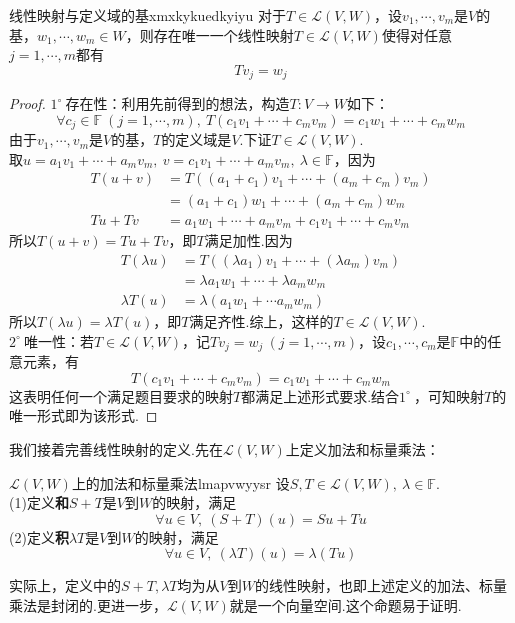 \documentclass[lang=cn, zihao=5]{elegantbook}
\newcommand{\F}{\mathbb{F}}
\newcommand{\lmap}{\mathcal{L}}
\newcommand{\buzhou}[1]{$#1^{\circ} \ $}
\begin{document}
\begin{proposition}{线性映射与定义域的基}{xmxkykuedkyiyu}
	对于$T \in \lmap (V,W)$，设$v_1, \cdots ,v_m$是$V$的基，$w_1, \cdots ,w_m \in W$，则存在唯一一个线性映射$T \in \lmap (V,W)$使得对任意$j=1, \cdots ,m$都有$$Tv_j = w_j$$
\end{proposition}
\begin{proof}
	\buzhou{1}存在性：利用先前得到的想法，构造$T:V \to W$如下：$$\forall c_j \in \F~(j=1, \cdots,m),~T(c_1v_1 + \cdots + c_mv_m) = c_1w_1 + \cdots + c_mw_m$$
	由于$v_1, \cdots ,v_m$是$V$的基，$T$的定义域是$V$.下证$T \in \lmap (V,W)$. \\
	取$u=a_1v_1 + \cdots + a_mv_m,~v=c_1v_1 + \cdots + a_mv_m,~ \lambda \in \F$，因为
	\begin{align*}
		T(u+v) &= T((a_1+c_1)v_1 + \cdots + (a_m+c_m)v_m) \\
		&= (a_1+c_1)w_1 + \cdots + (a_m+c_m)w_m \\
		Tu+Tv &= a_1w_1 + \cdots + a_mv_m + c_1v_1 + \cdots + c_mv_m
	\end{align*}
	所以$T(u+v)=Tu+Tv$，即$T$满足加性.因为
	\begin{align*}
		T(\lambda u) &= T((\lambda a_1)v_1 + \cdots + (\lambda a_m)v_m) \\
		&= \lambda a_1 w_1 + \cdots + \lambda a_m w_m \\
		\lambda T(u) &= \lambda (a_1w_1 + \cdots a_mw_m)
	\end{align*}
	所以$T(\lambda u)=\lambda T(u)$，即$T$满足齐性.综上，这样的$T \in \lmap (V,W)$. \\
	\buzhou{2}唯一性：若$T \in \lmap (V,W)$，记$T v_j = w_j~(j=1,\cdots ,m)$，设$c_1, \cdots ,c_m$是$\F$中的任意元素，有$$T(c_1v_1 + \cdots + c_mv_m) = c_1w_1 + \cdots + c_mw_m$$
	这表明任何一个满足题目要求的映射$T$都满足上述形式要求.结合\buzhou{1}，可知映射$T$的唯一形式即为该形式.
\end{proof}


我们接着完善线性映射的定义.先在$\lmap (V,W)$上定义加法和标量乘法：

\begin{definition}{$\lmap (V,W)$上的加法和标量乘法}{lmapvwyysr}
	设$S,T \in \lmap (V,W),~\lambda \in \F$. \\
	(1)定义\textbf{和}$S+T$是$V$到$W$的映射，满足$$\forall u \in V,~(S+T)(u)=Su+Tu$$
	(2)定义\textbf{积}$\lambda T$是$V$到$W$的映射，满足$$\forall u \in V,~(\lambda T)(u) = \lambda (Tu)$$
\end{definition}
\begin{remark}
	实际上，定义中的$S+T,\lambda T$均为从$V$到$W$的线性映射，也即上述定义的加法、标量乘法是封闭的.更进一步，$\lmap (V,W)$就是一个向量空间.这个命题易于证明.
\end{remark}
\end{document}
